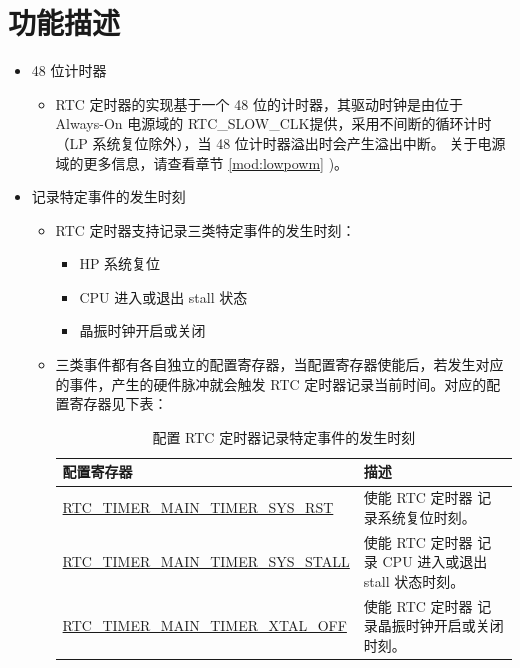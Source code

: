 \documentclass[main\_\_CN.tex]{subfiles}
\begin{document}

\section{功能描述}
\label{sec:rtctimer-func-descr}

\begin{itemize}
    \item 48 位计时器
    \begin{itemize}
        \item RTC 定时器的实现基于一个 48 位的计时器，其驱动时钟是由位于 Always-On 电源域的 RTC\_SLOW\_CLK提供，采用不间断的循环计时（LP 系统复位除外），当 48 位计时器溢出时会产生溢出中断。 关于电源域的更多信息，请查看章节 \ref{mod:lowpowm} \textit{})。
    \end{itemize}

    \item 记录特定事件的发生时刻
    \begin{itemize}
        \item RTC 定时器支持记录三类特定事件的发生时刻：
        \begin{itemize}
            \item HP 系统复位
            \item CPU 进入或退出 stall 状态
            \item 晶振时钟开启或关闭
        \end{itemize}
        \item 三类事件都有各自独立的配置寄存器，当配置寄存器使能后，若发生对应的事件，产生的硬件脉冲就会触发 RTC 定时器记录当前时间。对应的配置寄存器见下表：
        \begin{longtable}[c]{|p{6cm}|p{9cm}|}
        \caption{配置 RTC 定时器记录特定事件的发生时刻} \label{tab:configure-rtc-timer-log-time-of-specific-events}
        \\\hline
        \rowcolor{lightgray}
        \textbf{配置寄存器} & \textbf{描述} \\
        \hline
        \hyperref[fielddesc:RTCTIMERMAINTIMERSYSRST]{RTC\_TIMER\_MAIN\_TIMER\_SYS\_RST} &  使能 RTC 定时器 记录系统复位时刻。 \\
        \hline
        \hyperref[fielddesc:RTCTIMERMAINTIMERSYSSTALL]{RTC\_TIMER\_MAIN\_TIMER\_SYS\_STALL} &  使能 RTC 定时器 记录 CPU 进入或退出 stall 状态时刻。\\
        \hline
        \hyperref[fielddesc:RTCTIMERMAINTIMERXTALOFF]{RTC\_TIMER\_MAIN\_TIMER\_XTAL\_OFF} &  使能 RTC 定时器 记录晶振时钟开启或关闭时刻。\\
        \hline
        \end{longtable}
    \end{itemize}



\end{itemize}
\end{document}
